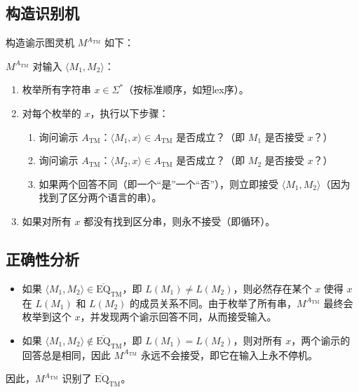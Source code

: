 \documentclass[11pt,addpoints,answers]{exam}
\begin{document}
\begin{questions}
\begin{solution}
    \subsection*{构造识别机}
    构造谕示图灵机 $M^{A_{\text{TM}}}$ 如下：
    
    $M^{A_{\text{TM}}}$ 对输入 $\langle M_1, M_2 \rangle$：
    \begin{enumerate}
        \item 枚举所有字符串 $x \in \Sigma^*$（按标准顺序，如短lex序）。
        \item 对每个枚举的 $x$，执行以下步骤：
        \begin{enumerate}
            \item 询问谕示 $A_{\text{TM}}$：$\langle M_1, x \rangle \in A_{\text{TM}}$ 是否成立？（即 $M_1$ 是否接受 $x$？）
            \item 询问谕示 $A_{\text{TM}}$：$\langle M_2, x \rangle \in A_{\text{TM}}$ 是否成立？（即 $M_2$ 是否接受 $x$？）
            \item 如果两个回答不同（即一个“是”一个“否”），则立即接受 $\langle M_1, M_2 \rangle$（因为找到了区分两个语言的串）。
        \end{enumerate}
        \item 如果对所有 $x$ 都没有找到区分串，则永不接受（即循环）。
    \end{enumerate}
    
    \subsection*{正确性分析}
    \begin{itemize}
        \item 如果 $\langle M_1, M_2 \rangle \in \overline{\text{EQ}}_{\text{TM}}$，即 $L(M_1) \neq L(M_2)$，则必然存在某个 $x$ 使得 $x$ 在 $L(M_1)$ 和 $L(M_2)$ 的成员关系不同。由于枚举了所有串，$M^{A_{\text{TM}}}$ 最终会枚举到这个 $x$，并发现两个谕示回答不同，从而接受输入。
        \item 如果 $\langle M_1, M_2 \rangle \notin \overline{\text{EQ}}_{\text{TM}}$，即 $L(M_1) = L(M_2)$，则对所有 $x$，两个谕示的回答总是相同，因此 $M^{A_{\text{TM}}}$ 永远不会接受，即它在输入上永不停机。
    \end{itemize}
    因此，$M^{A_{\text{TM}}}$ 识别了 $\overline{\text{EQ}}_{\text{TM}}$。
\end{solution}


 
\end{questions}
\end{document}
